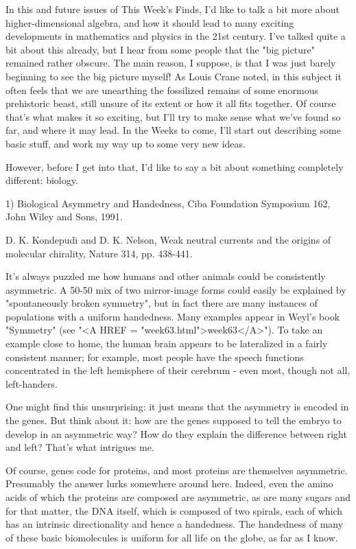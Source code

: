 

In this and future issues of This Week's Finds, I'd like to talk a bit
more about higher-dimensional algebra, and how it should lead to many
exciting developments in mathematics and physics in the 21st century.
I've talked quite a bit about this already, but I hear from some people
that the "big picture" remained rather obscure.  The main reason, I
suppose, is that I was just barely beginning to see the big picture
myself!  As Louis Crane noted, in this subject it often feels that we
are unearthing the fossilized remains of some enormous prehistoric
beast, still unsure of its extent or how it all fits together.  Of
course that's what makes it so exciting, but I'll try to make sense what
we've found so far, and where it may lead.  In the Weeks to come, I'll
start out describing some basic stuff, and work my way up to some very
new ideas.

However, before I get into that, I'd like to say a bit about something
completely different: biology.  

1) Biological Asymmetry and Handedness, Ciba Foundation Symposium 162,
John Wiley and Sons, 1991.

D. K. Kondepudi and D. K. Nelson, Weak neutral currents and the origins
of molecular chirality, Nature 314, pp. 438-441.


It's always puzzled me how humans and other animals could be
consistently asymmetric.  A 50-50 mix of two mirror-image forms could
easily be explained by "spontaneously broken symmetry", but in fact
there are many instances of populations with a uniform handedness.  Many
examples appear in Weyl's book "Symmetry" (see "<A HREF = "week63.html">week63</A>").  To take an
example close to home, the human brain appears to be lateralized in a
fairly consistent manner; for example, most people have the speech
functions concentrated in the left hemisphere of their cerebrum - even
most, though not all, left-handers.

One might find this unsurprising: it just means that the asymmetry is
encoded in the genes.  But think about it: how are the genes supposed to
tell the embryo to develop in an asymmetric way?  How do they explain
the difference between right and left?  That's what intrigues me.

Of course, genes code for proteins, and most proteins are themselves
asymmetric.  Presumably the answer lurks somewhere around here.  Indeed,
even the amino acids of which the proteins are composed are asymmetric,
as are many sugars and for that matter, the DNA itself, which is
composed of two spirals, each of which has an intrinsic directionality
and hence a handedness.  The handedness of many of these basic
biomolecules is uniform for all life on the globe, as far as I know.

